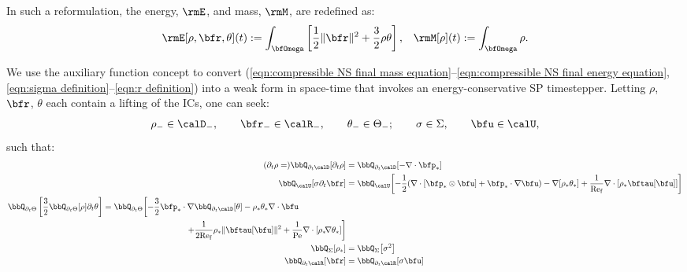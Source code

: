     In such a reformulation, the energy, $\rmE$, and mass, $\rmM$, are redefined as:
    \begin{align}
        \rmE[\rho, \bfr, \theta](t)  :=  \int_{\bfOmega}\left[\frac{1}{2}\|\bfr\|^{2} + \frac{3}{2}\rho\theta\right],  &&
                      \rmM[\rho](t)  :=  \int_{\bfOmega}\rho.
    \end{align}

    \line

    We use the auxiliary function concept to convert (\ref{eqn:compressible NS final mass equation}--\ref{eqn:compressible NS final energy equation}, \ref{eqn:sigma definition}--\ref{eqn:r definition}) into a weak form in space-time that invokes an energy-conservative SP timestepper. Letting $\rho$, $\bfr$, $\theta$ each contain a lifting of the ICs, one can seek:
    \begin{equation}
        \rho_{-}    \in  \calD_{-},   \qquad
        \bfr_{-}    \in  \calR_{-},   \qquad
        \theta_{-}  \in  \Theta_{-};  \qquad
        \sigma      \in  \Sigma,      \qquad
        \bfu        \in  \calU,
    \end{equation}
    such that:
    \begin{align}
            (\partial_{t}\rho
            =)
            \bbQ_{\partial_{t}\calD}[\partial_{t}\rho]
            &=
            \bbQ_{\partial_{t}\calD}[- \nabla\cdot\bfp_{*}]  \label{eqn:compressible NS weak mass equation}  \\
            \bbQ_{\calU}[\sigma\partial_{t}\bfr]
            &=
            \bbQ_{\calU}\!\left[- \frac{1}{2}(\nabla\cdot\left[\bfp_{*}\otimes\bfu\right] + \bfp_{*}\cdot\nabla\bfu)
            - \nabla[\rho_{*}\theta_{*}]
            + \frac{1}{\rmRef}\nabla\cdot[\rho_{*}\bftau[\bfu]]\right]  \\
        \begin{split}
            \bbQ_{\partial_{t}\Theta}\left[\frac{3}{2}\bbQ_{\partial_{t}\Theta}[\rho]\partial_{t}\theta\right]
            &=
            \bbQ_{\partial_{t}\Theta}\!\left[- \frac{3}{2}\bfp_{*}\cdot\nabla\bbQ_{\partial_{t}\calD}[\theta]
            - \rho_{*}\theta_{*}\nabla\cdot\bfu\right.  \\
            &\qquad\qquad\qquad\qquad\qquad\left.+ \frac{1}{2\rmRef}\rho_{*}\|\bftau[\bfu]\|^{2}
            + \frac{1}{\rmPe}\nabla\cdot[\rho_{*}\!\nabla\theta_{*}]\right]
        \end{split}  \label{eqn:compressible NS weak energy equation}  \\
            \bbQ_{\Sigma}[\rho_{*}]
            &=
            \bbQ_{\Sigma}\!\left[\sigma^{2}\right]  \\
            \bbQ_{\partial_{t}\calR}[\bfr]
            &=
            \bbQ_{\partial_{t}\calR}[\sigma\bfu]
    \end{align}
